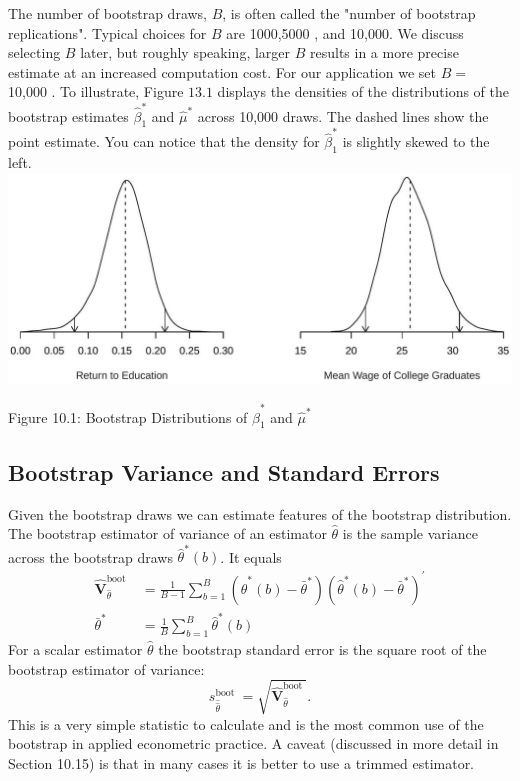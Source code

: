 \documentclass[10pt]{article}
\begin{document}
The number of bootstrap draws, $B$, is often called the "number of bootstrap replications". Typical choices for $B$ are 1000,5000 , and 10,000. We discuss selecting $B$ later, but roughly speaking, larger $B$ results in a more precise estimate at an increased computation cost. For our application we set $B=$ 10,000 . To illustrate, Figure $13.1$ displays the densities of the distributions of the bootstrap estimates $\widehat{\beta}_{1}^{*}$ and $\widehat{\mu}^{*}$ across 10,000 draws. The dashed lines show the point estimate. You can notice that the density for $\widehat{\beta}_{1}^{*}$ is slightly skewed to the left.\\

\includegraphics[max width=\textwidth]{2022_09_17_704b7bd5000562ad7735g-09}

Figure 10.1: Bootstrap Distributions of $\widehat{\beta}_{1}^{*}$ and $\widehat{\mu}^{*}$

\subsection{Bootstrap Variance and Standard Errors}
Given the bootstrap draws we can estimate features of the bootstrap distribution. The bootstrap estimator of variance of an estimator $\widehat{\theta}$ is the sample variance across the bootstrap draws $\widehat{\theta}^{*}(b)$. It equals
$$
\begin{aligned}
\widehat{\boldsymbol{V}}_{\widehat{\theta}}^{\text {boot }} &=\frac{1}{B-1} \sum_{b=1}^{B}\left(\widehat{\theta}^{*}(b)-\bar{\theta}^{*}\right)\left(\widehat{\theta}^{*}(b)-\bar{\theta}^{*}\right)^{\prime} \\
\bar{\theta}^{*} &=\frac{1}{B} \sum_{b=1}^{B} \widehat{\theta}^{*}(b)
\end{aligned}
$$
For a scalar estimator $\hat{\theta}$ the bootstrap standard error is the square root of the bootstrap estimator of variance:
$$
s_{\widehat{\widehat{\theta}}}^{\text {boot }}=\sqrt{\widehat{\boldsymbol{V}}_{\widehat{\theta}}^{\text {boot }}} .
$$
This is a very simple statistic to calculate and is the most common use of the bootstrap in applied econometric practice. A caveat (discussed in more detail in Section 10.15) is that in many cases it is better to use a trimmed estimator.
\end{document}
